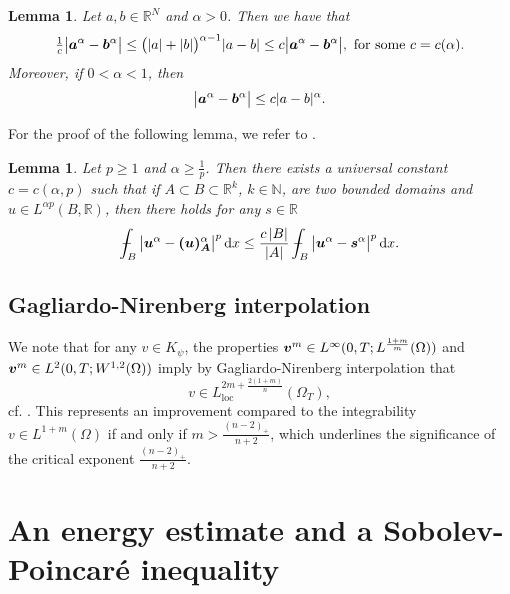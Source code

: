 \documentclass[a4paper, 10pt, american]{amsart}
\newtheorem{lemma}[theorem]{Lemma}
\numberwithin{theorem}{section}
\numberwithin{equation}{section}
\newcommand{\mint}{- \mskip-19,5mu \int}
\def\N{\mathbb{N}}
\def\R{\mathbb{R}}
\newcommand{\dx}{\,\mathrm{d}x}
\newcommand{\power}[2]{\bm{#1^{\mbox{\unboldmath{\scriptsize$#2$}}}}}
\begin{document}
\begin{lemma}\label{lem:a-b}
Let $a,b\in\R^N$ and $\alpha>0$. Then we have that
\begin{align}\label{a-b-1}
 \tfrac1c\big|\power{a}{\alpha} - \power{b}{\alpha}\big|
	\le
	\big(|a| + |b|\big)^{\alpha-1}|a-b|
	\le
	c \big|\power{a}{\alpha} - \power{b}{\alpha}\big|,
	\mbox{ for some $c=c(\alpha)$.}
\end{align}
Moreover, if $0<\alpha<1$, then
\begin{align}\label{a-b-2}
        \big|\power{a}{\alpha} - \power{b}{\alpha}\big|
        \le
        c|a-b|^\alpha.
\end{align}
\end{lemma}

For the proof of the following lemma, we refer to \cite[Lemma 3.5]{BDKS:2018}.

\begin{lemma} \label{lem:mvint}
Let $p\ge1$ and $\alpha\ge \frac1 p$. Then there exists a universal constant $c=c(\alpha,p)$ such that if $A\subset B\subset \R^k$, $k\in\N$, are two bounded domains and $u \in L^{\alpha p}(B,\R)$, then there holds for any $s\in\R$
$$
	\mint_B \big|\power{u}{\alpha}-\power{(u)_A}{\alpha}\big|^p \dx 
	\leq 
	\frac{c\,|B|}{|A|} \mint_B \big|\power{u}{\alpha}-\power{s}{\alpha}\big|^p \dx.
$$

\end{lemma}

\subsection{Gagliardo-Nirenberg interpolation}

We note that for any $v\in K_\psi$, the properties $\power vm\in
L^\infty(0,T;L^{\frac{1+m}{m}}(\Omega))$ and $\power vm\in
  L^2(0,T;W^{1,2}(\Omega))$ imply by Gagliardo-Nirenberg interpolation
  that
  \begin{equation}
    \label{integrability-Kpsi}
    v\in L^{2m+\frac{2(1+m)}{n}}_{\mathrm{loc}}(\Omega_T),
  \end{equation}
  cf. \cite[Chapter 2, Prop. 4.1]{DBGV-book}. This represents an improvement compared
  to the integrability $v\in L^{1+m}(\Omega)$ 
  if and only if $m>\frac{(n-2)_+}{n+2}$,
  which underlines the significance of the critical exponent 
  $\frac{(n-2)_+}{n+2}$.   




\section{An energy estimate and a Sobolev-Poincar\'e inequality}
\label{sec:energy-poincare}
\end{document}
